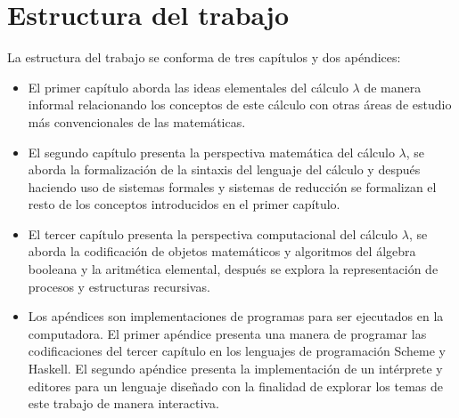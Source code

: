 \section*{Estructura del trabajo}

La estructura del trabajo se conforma de tres capítulos y dos apéndices:

\begin{itemize}
\item El primer capítulo aborda las ideas elementales del cálculo $ λ $ de manera informal relacionando los conceptos de este cálculo con otras áreas de estudio más convencionales de las matemáticas.

\item El segundo capítulo presenta la perspectiva matemática del cálculo $ λ $, se aborda la formalización de la sintaxis del lenguaje del cálculo y después haciendo uso de sistemas formales y sistemas de reducción se formalizan el resto de los conceptos introducidos en el primer capítulo.

\item El tercer capítulo presenta la perspectiva computacional del cálculo $ λ $, se aborda la codificación de objetos matemáticos y algoritmos del álgebra booleana y la aritmética elemental, después se explora la representación de procesos y estructuras recursivas.

\item Los apéndices son implementaciones de programas para ser ejecutados en la computadora. El primer apéndice presenta una manera de programar las codificaciones del tercer capítulo en los lenguajes de programación Scheme y Haskell. El segundo apéndice presenta la implementación de un intérprete y editores para un lenguaje diseñado con la finalidad de explorar los temas de este trabajo de manera interactiva.
\end{itemize}

